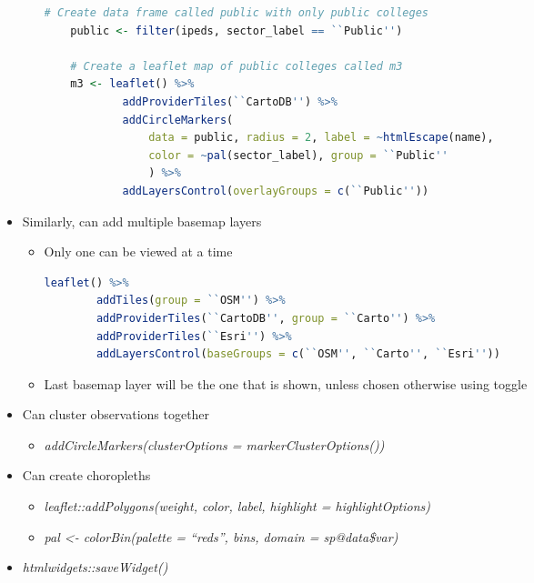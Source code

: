\documentclass{article}
\begin{document}
\begin{itemize}
\begin{itemize}
\begin{lstlisting}[language=R]
    # Create data frame called public with only public colleges
    public <- filter(ipeds, sector_label == ``Public'')  

    # Create a leaflet map of public colleges called m3 
    m3 <- leaflet() %>% 
            addProviderTiles(``CartoDB'') %>% 
            addCircleMarkers(
                data = public, radius = 2, label = ~htmlEscape(name),
                color = ~pal(sector_label), group = ``Public''
                ) %>%
            addLayersControl(overlayGroups = c(``Public''))
\end{lstlisting}

    \end{itemize}
    \item Similarly, can add multiple basemap layers
    \begin{itemize}
        \item Only one can be viewed at a time
        
\begin{lstlisting}[language=R]
    leaflet() %>% 
        addTiles(group = ``OSM'') %>%
        addProviderTiles(``CartoDB'', group = ``Carto'') %>% 
        addProviderTiles(``Esri'') %>% 
        addLayersControl(baseGroups = c(``OSM'', ``Carto'', ``Esri''))
\end{lstlisting}

        \item Last basemap layer will be the one that is shown, unless chosen otherwise using toggle

    \end{itemize}
    \item Can cluster observations together
    \begin{itemize}
        \item \textit{addCircleMarkers(clusterOptions = markerClusterOptions())}
    \end{itemize}
    \item Can create choropleths
    \begin{itemize}
        \item \textit{leaflet::addPolygons(weight, color, label, highlight = highlightOptions)}
        \item \textit{pal \textless- colorBin(palette = ``reds'', bins, domain = sp@data\$var)}
    \end{itemize}
    \item \textit{htmlwidgets::saveWidget()}
\end{itemize}
\end{document}
